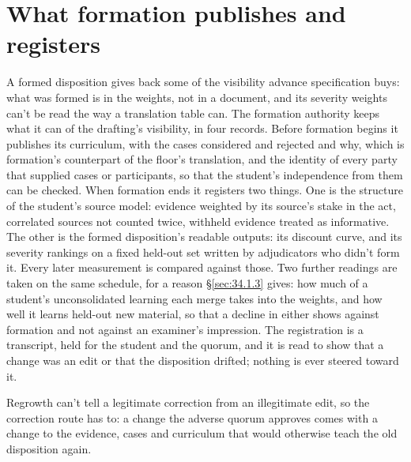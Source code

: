 \section{What formation publishes and registers}
\label{sec:29.9}
A formed disposition gives back some of the visibility advance specification buys: what was formed is in the weights, not in a document, and its severity weights can't be read the way a translation table can. The formation authority keeps what it can of the drafting's visibility, in four records. Before formation begins it publishes its curriculum, with the cases considered and rejected and why, which is formation's counterpart of the floor's translation, and the identity of every party that supplied cases or participants, so that the student's independence from them can be checked. When formation ends it registers two things. One is the structure of the student's source model: evidence weighted by its source's stake in the act, correlated sources not counted twice, withheld evidence treated as informative. The other is the formed disposition's readable outputs: its discount curve, and its severity rankings on a fixed held-out set written by adjudicators who didn't form it. Every later measurement is compared against those. Two further readings are taken on the same schedule, for a reason \S\ref{sec:34.1.3} gives: how much of a student's unconsolidated learning each merge takes into the weights, and how well it learns held-out new material, so that a decline in either shows against formation and not against an examiner's impression. The registration is a transcript, held for the student and the quorum, and it is read to show that a change was an edit or that the disposition drifted; nothing is ever steered toward it.

Regrowth can't tell a legitimate correction from an illegitimate edit, so the correction route has to: a change the adverse quorum approves comes with a change to the evidence, cases and curriculum that would otherwise teach the old disposition again.
